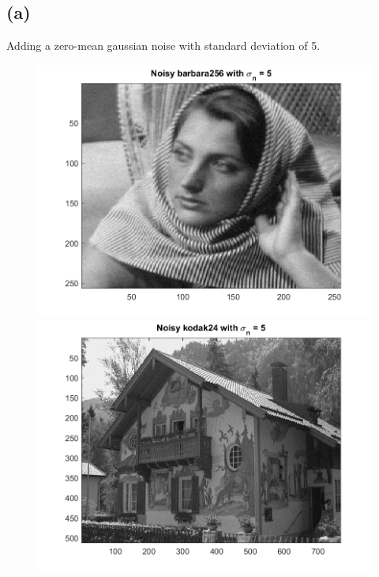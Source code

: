 \documentclass{article}
\begin{document}
\subsection*{(a)}

Adding a zero-mean gaussian noise with standard deviation of 5.

\begin{figure}[!htb]
    \centering
    \begin{minipage}[b]{0.45\textwidth}
        \includegraphics[width=\textwidth]{barbara256_noise5.png}
    \end{minipage}
    \begin{minipage}[b]{0.45\textwidth}
        \includegraphics[width=\textwidth]{kodak24_noise5.png}
    \end{minipage}
\end{figure}
\end{document}
